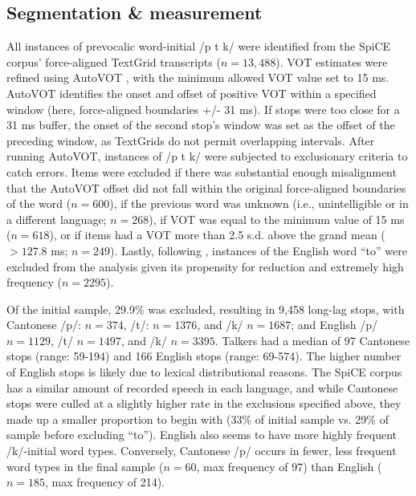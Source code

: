 \subsection{Segmentation \& measurement}
All instances of prevocalic word-initial /p t k/ were identified from the SpiCE corpus' force-aligned TextGrid transcripts ($n=13,488$). VOT estimates were refined using AutoVOT \citep{keshet_2014_autovot}, with the minimum allowed VOT value set to 15 ms. AutoVOT identifies the onset and offset of positive VOT within a specified window (here, force-aligned boundaries +/- 31 ms). If stops were too close for a 31 ms buffer, the onset of the second stop's window was set as the offset of the preceding window, as TextGrids do not permit overlapping intervals. After running AutoVOT, instances of /p t k/ were subjected to exclusionary criteria to catch errors. Items were excluded if there was substantial enough misalignment that the AutoVOT offset did not fall within the original force-aligned boundaries of the word ($n=600$), if the previous word was unknown (i.e., unintelligible or in a different language; $n=268$), if VOT was equal to the minimum value of 15 ms ($n=618$),  or if items had a VOT more than 2.5 s.d. above the grand mean ($>127.8$ ms; $n=249$). Lastly, following \citep{chodroff_2017_structure}, instances of the English word ``to'' were excluded from the analysis given its propensity for reduction and extremely high frequency ($n=2295$). 


Of the initial sample, 29.9\% was excluded, resulting in 9,458 long-lag stops, with Cantonese /p/: $n=374$, /t/: $n=1376$, and /k/ $n=1687$; and English /p/ $n=1129$, /t/ $n=1497$, and /k/ $n=3395$. Talkers had a median of 97 Cantonese stops (range: 59-194) and 166 English stops (range: 69-574). The higher number of English stops is likely due to lexical distributional reasons. The SpiCE corpus has a similar amount of recorded speech in each language, and while Cantonese stops were culled at a slightly higher rate in the exclusions specified above, they made up a smaller proportion to begin with (33\% of initial sample vs. 29\% of sample before excluding ``to''). English also seems to have more highly frequent /k/-initial word types. Conversely, Cantonese /p/ occurs in fewer, less frequent word types in the final sample ($n=60$, max frequency of 97) than English ($n=185$, max frequency of 214).

